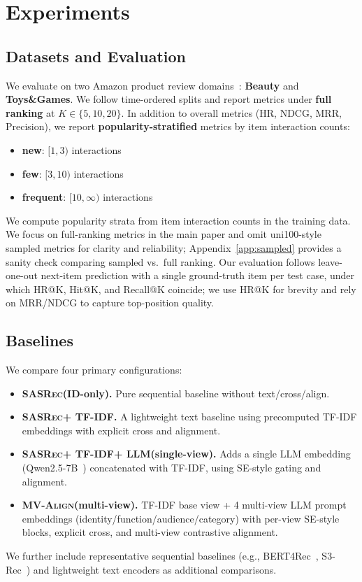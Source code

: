 \documentclass[sigconf,natbib=true]{acmart}
\newcommand{\model}{\textsc{MV-Align}\xspace}
\newcommand{\base}{\textsc{SASRec}\xspace}
\newcommand{\tfidf}{\textsc{TF-IDF}\xspace}
\newcommand{\llm}{\textsc{LLM}\xspace}
\begin{document}
\section{Experiments}
\subsection{Datasets and Evaluation}
We evaluate on two Amazon product review domains~\cite{mcauley2015amazon,ni2019amazon}: \textbf{Beauty} and
\textbf{Toys\&Games}. We follow time-ordered splits and
report metrics under \textbf{full ranking} at $K\in\{5,10,20\}$.
In addition to overall metrics (HR, NDCG, MRR, Precision),
we report \textbf{popularity-stratified} metrics by item
interaction counts:
\begin{itemize}[leftmargin=*,itemsep=1pt]
  \item \textbf{new}: $[1,3)$ interactions
  \item \textbf{few}: $[3,10)$ interactions
  \item \textbf{frequent}: $[10,\infty)$ interactions
\end{itemize}
We compute popularity strata from item interaction counts in
the training data. We focus on full-ranking metrics in the
main paper and omit uni100-style sampled metrics for clarity
and reliability; Appendix~\ref{app:sampled} provides a sanity
check comparing sampled vs.\ full ranking. Our evaluation
follows leave-one-out next-item prediction with a single
ground-truth item per test case, under which HR@K, Hit@K, and
Recall@K coincide; we use HR@K for brevity and rely on
MRR/NDCG to capture top-position quality.

\subsection{Baselines}
We compare four primary configurations:
\begin{itemize}[leftmargin=*,itemsep=2pt]
  \item \textbf{\base (ID-only).} Pure sequential baseline
    without text/cross/align.
  \item \textbf{\base + \tfidf.} A lightweight text baseline
    using precomputed \tfidf embeddings with explicit cross
    and alignment.
  \item \textbf{\base + \tfidf + \llm (single-view).} Adds a
    single \llm embedding (Qwen2.5-7B~\cite{qwen2024qwen25}) concatenated with
    \tfidf, using SE-style gating and alignment.
  \item \textbf{\model (multi-view).} \tfidf base view + 4
    multi-view \llm prompt embeddings
    (identity/function/audience/category) with per-view SE-style blocks,
    explicit cross, and multi-view contrastive alignment.
\end{itemize}
We further include representative sequential baselines (e.g.,
BERT4Rec~\cite{sun2019bert4rec}, S3-Rec~\cite{zhou2020s3rec})
and lightweight text encoders as additional comparisons.
\end{document}
